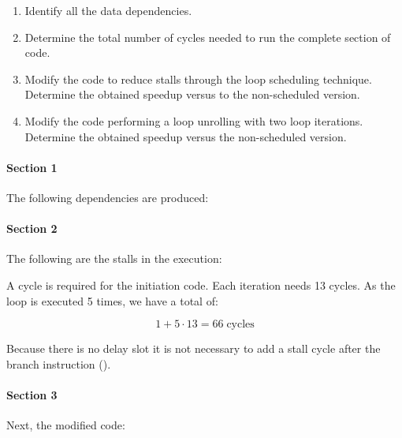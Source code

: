 \begin{enumerate}

  \item Identify all the data dependencies.

  \item Determine the total number of cycles needed to run the complete section of code.

  \item Modify the code to reduce stalls through the loop scheduling technique. Determine
        the obtained speedup versus to the non-scheduled version.

  \item Modify the code performing a loop unrolling with two loop iterations. Determine
        the obtained speedup versus the non-scheduled version.

\end{enumerate}


\begin{acsolution}
\end{acsolution}

\paragraph{Section 1}

The following dependencies are produced:



\paragraph{Section 2}

The following are the stalls in the execution:



A cycle is required for the initiation code. Each iteration needs 13 cycles. As the loop is executed 5 times, we have a total of:

\[
1+5 \cdot 13 = 66 \; \textrm{cycles}
\]

Because there is no delay slot it is not necessary to add a stall cycle after the branch instruction ().

\paragraph{Section 3}

Next, the modified code:



